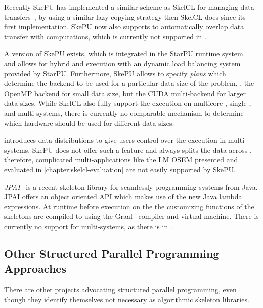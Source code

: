 Recently SkePU has implemented a similar scheme as SkelCL for managing data transfers~\cite{DastgeerKe14}, by using a similar lazy copying strategy then SkelCL does since its first implementation.
SkePU now also supports to automatically overlap data transfer with computations, which is currently not supported in \SkelCL.

A version of SkePU exists, which is integrated in the StarPU runtime system~\cite{AugonnetTNW09} and allows for hybrid \CPU and \GPU execution with an dynamic load balancing system provided by StarPU.
Furthermore, SkePU allows to specify \emph{plans} which determine the backend to be used for a particular data size of the problem, \eg, the OpenMP backend for small data size, but the CUDA multi-\GPU backend for larger data sizes.
While SkelCL also fully support the execution on multicore \CPUs, single \GPUs, and  multi-\GPU systems, there is currently no comparable mechanism to determine which hardware should be used for different data sizes.

\SkelCL introduces data distributions to give users control over the execution in multi-\GPU systems.
SkePU does not offer such a feature and always splits the data across \GPUs, therefore, complicated multi-\GPU applications like the LM OSEM presented and evaluated in \autoref{chapter:skelcl-evaluation} are not easily supported by SkePU.

\bigskip

\emph{JPAI}~\cite{FumeroStDu2014} is a recent skeleton library for seamlessly programming \GPU systems from Java.
JPAI offers an object oriented API which makes use of the new Java lambda expressions.
At runtime before execution on the \GPU the customizing functions of the skeletons are compiled to \OpenCL using the Graal~\cite{DuboscqStWuSiWiMo2013} compiler and virtual machine.
There is currently no support for multi-\GPU systems, as there is in \SkelCL.


\subsection[Other Structured Parallel Programming\\ Approaches]{Other Structured Parallel Programming Approaches}
There are other projects advocating structured parallel programming, even though they identify themselves not necessary as algorithmic skeleton libraries.

\bigskip


